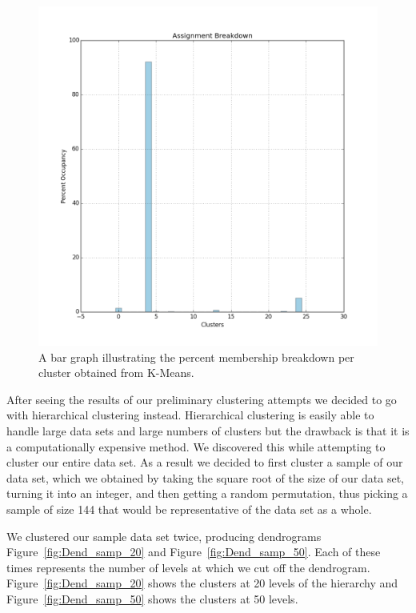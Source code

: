 \documentclass[12pt]{article}
\begin{document}
\begin{figure}
    \includegraphics[width=\textwidth]{classBargraph.png}
    \caption{A bar graph illustrating the percent membership breakdown per cluster obtained from K-Means.}
    \label{fig:cluster_26_membership}
    
\end{figure}

After seeing the results of our preliminary clustering attempts we decided to go with hierarchical clustering instead.
Hierarchical clustering is easily able to handle large data sets and large numbers of clusters but the drawback is that it is a computationally expensive method.
We discovered this while attempting to cluster our entire data set.
As a result we decided to first cluster a sample of our data set, which we obtained by taking the square root of the size of our data set, turning it into an integer, and then getting a random permutation, thus picking a sample of size 144 that would be representative of the data set as a whole.

We clustered our sample data set twice, producing dendrograms Figure~\ref{fig:Dend_samp_20} and Figure~\ref{fig:Dend_samp_50}. 
Each of these times represents the number of levels at which we cut off the dendrogram. Figure~\ref{fig:Dend_samp_20} shows the clusters at 20 levels of the hierarchy and Figure~\ref{fig:Dend_samp_50} shows the clusters at 50 levels.
\end{document}
